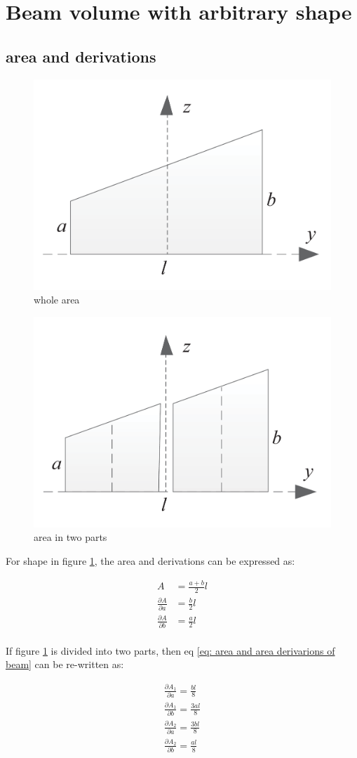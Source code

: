 \section{Beam volume with arbitrary shape}

\subsection{area and derivations}
\begin{figure}[h!]
\centering
\includegraphics[width=0.3\linewidth]{Figures/beamVol_wholeArea}
\caption{whole area}
\label{fig:beamvolwholearea}
\end{figure}

\begin{figure}[h!]
\centering
\includegraphics[width=0.3\linewidth]{Figures/beamVol_twoParts}
\caption{area in two parts}
\label{fig:beamvoltwoparts}
\end{figure}

For  shape in figure \ref{fig:beamvolwholearea}, the area and derivations can be expressed as:

\begin{equation} \label{eq: area and area derivarions of beam}
\begin{split}
A &= \frac{a+b}{2} l \\
\frac{\partial A}{\partial a} &= \frac{b}{2} l \\
\frac{\partial A}{\partial b} &= \frac{a}{2} l \\
\end{split}
\end{equation}

If figure \ref{fig:beamvolwholearea} is divided into two parts, then eq \ref{eq: area and area derivarions of beam} can be re-written as:

\begin{align*}
	\frac{\partial A_1}{\partial a} = \frac{bl}{8} \\
	\frac{\partial A_1}{\partial b} = \frac{3al}{8} \\
	\frac{\partial A_2}{\partial a} = \frac{3bl}{8} \\
	\frac{\partial A_2}{\partial b} = \frac{al}{8}
\end{align*}

